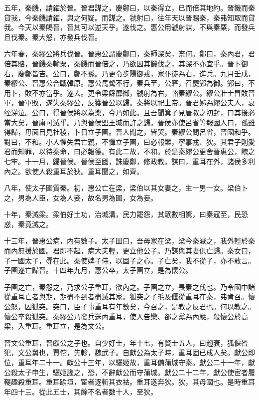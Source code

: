 五年，秦饑，請糴於晉。晉君謀之，慶鄭曰，以秦得立，已而倍其地約。晉饑而秦貸我，今秦饑請糴，與之何疑。而謀之。虢射曰，往年天以晉賜秦，秦弗知取而貸我。今天以秦賜晉，晉其可以逆天乎。遂伐之。惠公用虢射謀，不與秦粟，而發兵且伐秦。秦大怒，亦發兵伐晉。

六年春，秦繆公將兵伐晉。晉惠公謂慶鄭曰，秦師深矣，柰何。鄭曰，秦內君，君倍其賂，晉饑秦輸粟，秦饑而晉倍之，乃欲因其饑伐之，其深不亦宜乎。晉卜御右，慶鄭皆吉。公曰，鄭不孫。乃更令步陽御戎，家仆徒為右，進兵。九月壬戌，秦繆公、晉惠公合戰韓原。惠公馬騺不行，秦兵至，公窘，召慶鄭為御。鄭曰，不用卜，敗不亦當乎。遂去。更令梁繇靡御，虢射為右，輅秦繆公。繆公壯士冒敗晉軍，晉軍敗，遂失秦繆公，反獲晉公以歸。秦將以祀上帝。晉君姊為繆公夫人，衰绖涕泣。公曰，得晉侯將以為樂，今乃如此。且吾聞箕子見唐叔之初封，曰其後必當大矣，晉庸可滅乎。乃與晉侯盟王城而許之歸。晉侯亦使呂省等報國人曰，孤雖得歸，毋面目見社稷，卜日立子圉。晉人聞之，皆哭。秦繆公問呂省，晉國和乎。對曰，不和。小人懼失君亡親，不憚立子圉，曰必報讎，寧事戎、狄。其君子則愛君而知罪，以待秦命，曰必報德。有此二故，不和。於是秦繆公更舍晉惠公，餽之七牢。十一月，歸晉侯。晉侯至國，誅慶鄭，修政教。謀曰，重耳在外，諸侯多利內之。欲使人殺重耳於狄。重耳聞之，如齊。

八年，使太子圉質秦。初，惠公亡在梁，梁伯以其女妻之，生一男一女。梁伯卜之，男為人臣，女為人妾，故名男為圉，女為妾。

十年，秦滅梁。梁伯好土功，治城溝，民力罷怨，其眾數相驚，曰秦寇至，民恐惑，秦竟滅之。

十三年，晉惠公病，內有數子。太子圉曰，吾母家在梁，梁今秦滅之，我外輕於秦而內無援於國。君即不起，病大夫輕，更立他公子。乃謀與其妻俱亡歸。秦女曰，子一國太子，辱在此。秦使婢子侍，以固子之心。子亡矣，我不從子，亦不敢言。子圉遂亡歸晉。十四年九月，惠公卒，太子圉立，是為懷公。

子圉之亡，秦怨之，乃求公子重耳，欲內之。子圉之立，畏秦之伐也。乃令國中諸從重耳亡者與期，期盡不到者盡滅其家。狐突之子毛及偃從重耳在秦，弗肯召。懷公怒，囚狐突。突曰，臣子事重耳有年數矣，今召之，是教之反君也。何以教之。懷公卒殺狐突。秦繆公乃發兵送內重耳，使人告欒、郤之黨為內應，殺懷公於高梁，入重耳。重耳立，是為文公。

晉文公重耳，晉獻公之子也。自少好士，年十七，有賢士五人，曰趙衰，狐偃咎犯，文公舅也，賈佗，先軫，魏武子。自獻公為太子時，重耳固已成人矣。獻公即位，重耳年二十一。獻公十三年，以驪姬故，重耳備蒲城守秦。獻公二十一年，獻公殺太子申生，驪姬讒之，恐，不辭獻公而守蒲城。獻公二十二年，獻公使宦者履鞮趣殺重耳。重耳踰垣，宦者逐斬其衣袪。重耳遂奔狄。狄，其母國也。是時重耳年四十三。從此五士，其餘不名者數十人，至狄。

